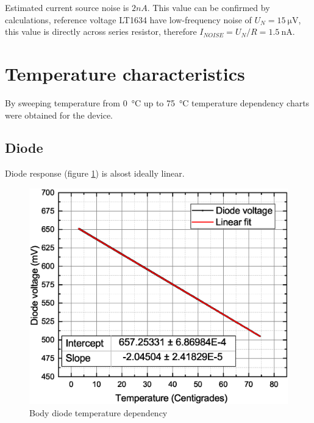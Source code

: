         Estimated current source noise is $2 nA$.
        This value can be confirmed by calculations, reference voltage LT1634 have low-frequency noise of $U_N = \SI{15}{\uV}$, this value is directly across series resistor, therefore $I_{NOISE} = U_N/R = \SI{1.5}{\nA}$. %



\section{Temperature characteristics}
    By sweeping temperature from \SI{0}{\degreeCelsius} up to \SI{75}{\degreeCelsius} temperature dependency charts were obtained for the device.

    \subsection{Diode}
        Diode response (figure \ref{Body_diode_temperature_dependency}) is alsost ideally linear.
        \begin{figure}[H]
            \centering
            \includegraphics[width=0.6\paperwidth]{img/07/diodeVsTemperature.eps}
            \caption{Body diode temperature dependency}
            \label{Body_diode_temperature_dependency}
        \end{figure}


